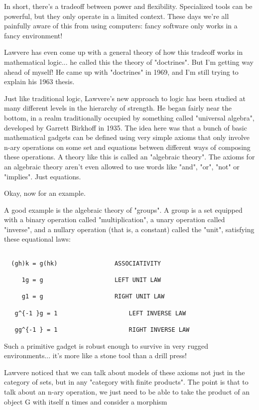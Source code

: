 In short, there's a tradeoff between power and flexibility.  Specialized
tools can be powerful, but they only operate in a limited context.  
These days we're all painfully aware of this from using computers: fancy 
software only works in a fancy environment!  

Lawvere has even come up with a general theory of how this tradeoff
works in mathematical logic... he called this the theory of
"doctrines".  But I'm getting way ahead of myself!  He came
up with "doctrines" in 1969, and I'm still trying to explain
his 1963 thesis.


Just like traditional logic, Lawvere's new approach to logic has been
studied at many different levels in the hierarchy of strength.  He
began fairly near the bottom, in a realm traditionally occupied by
something called "universal algebra", developed by Garrett
Birkhoff in 1935.  The idea here was that a bunch of basic
mathematical gadgets can be defined using very simple axioms that only
involve n-ary operations on some set and equations between different
ways of composing these operations.  A theory like this is called an
"algebraic theory".  The axioms for an algebraic theory
aren't even allowed to use words like "and", "or",
"not" or "implies".  Just equations.

Okay, now for an example.


A good example is the algebraic theory of "groups".  A group
is a set equipped with a binary operation called
"multiplication", a unary operation called
"inverse", and a nullary operation (that is, a constant)
called the "unit", satisfying these equational laws:


\begin{verbatim}

  (gh)k = g(hk)                ASSOCIATIVITY

     1g = g                    LEFT UNIT LAW
                               
     g1 = g                    RIGHT UNIT LAW

   g^{-1 }g = 1                    LEFT INVERSE LAW
                               
   gg^{-1 } = 1                    RIGHT INVERSE LAW
\end{verbatim}
    

Such a primitive gadget is robust enough to survive in very rugged 
environments... it's more like a stone tool than a drill press!

Lawvere noticed that we can talk about models of these axioms not just
in the category of sets, but in any "category with finite
products".  The point is that to talk about an n-ary operation,
we just need to be able to take the product of an object G with itself
n times and consider a morphism


